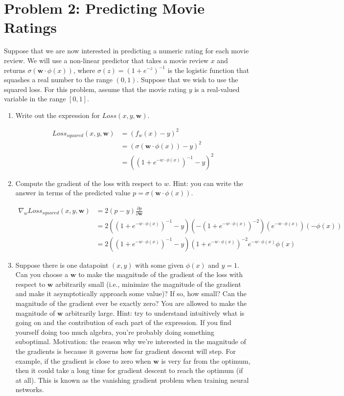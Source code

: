\documentclass[10pt]{article}
\begin{document}
\section*{\normalsize Problem 2: Predicting Movie Ratings}

Suppose that we are now interested in predicting a numeric rating for each movie review. We will use a non-linear predictor that takes a movie review $x$ and returns $\sigma(\mathbf{w} \cdot \phi(x))$, where $\sigma(z)=(1+e^{-z})^{-1}$ is the logistic function that squashes a real number to the range $(0,1)$. Suppose that we wish to use the squared loss. For this problem, assume that the movie rating $y$ is a real-valued variable in the range $[0,1]$.

\begin{enumerate}[label=(\alph*)]

  \item Write out the expression for $Loss(x, y, \mathbf{w})$.
  
  \begin{align*}
  Loss_{squared} (x, y, \mathbf{w}) &= (f_w(x) - y)^2\\
  &= (\sigma(\mathbf{w} \cdot \phi(x)) - y)^2\\
  &= ((1 + e^{-w \cdot \phi(x)})^{-1} - y)^2
  \end{align*}
  
  \item Compute the gradient of the loss with respect to $w$. Hint: you can write the answer in terms of the predicted value $p = \sigma(\mathbf{w} \cdot \phi(x))$.
  
  \begin{align*}
  \nabla_w Loss_{squared} (x, y, \mathbf{w}) &= 2(p - y) \frac{\partial p}{\partial \mathbf{w}}\\
  &= 2((1 + e^{-w \cdot \phi(x)})^{-1} - y)(-(1 + e^{-w \cdot \phi(x)})^{-2})(e^{-w \cdot \phi(x)})(-\phi(x))\\
  &= 2((1 + e^{-w \cdot \phi(x)})^{-1} - y)(1 + e^{-w \cdot \phi(x)})^{-2}e^{-w \cdot \phi(x)}\phi(x)
  \end{align*}
  
  \item Suppose there is one datapoint $(x, y)$ with some given $\phi(x)$ and $y = 1$. Can you choose a $\mathbf{w}$ to make the magnitude of the gradient of the loss with respect to $\mathbf{w}$ arbitrarily small (i.e., minimize the magnitude of the gradient and make it asymptotically approach some value)? If so, how small? Can the magnitude of the gradient ever be exactly zero? You are allowed to make the magnitude of $\mathbf{w}$ arbitrarily large. Hint: try to understand intuitively what is going on and the contribution of each part of the expression. If you find yourself doing too much algebra, you're probably doing something suboptimal. Motivation: the reason why we're interested in the magnitude of the gradients is because it governs how far gradient descent will step. For example, if the gradient is close to zero when $\mathbf{w}$ is very far from the optimum, then it could take a long time for gradient descent to reach the optimum (if at all). This is known as the vanishing gradient problem when training neural networks.
  

\end{enumerate}
\end{document}
